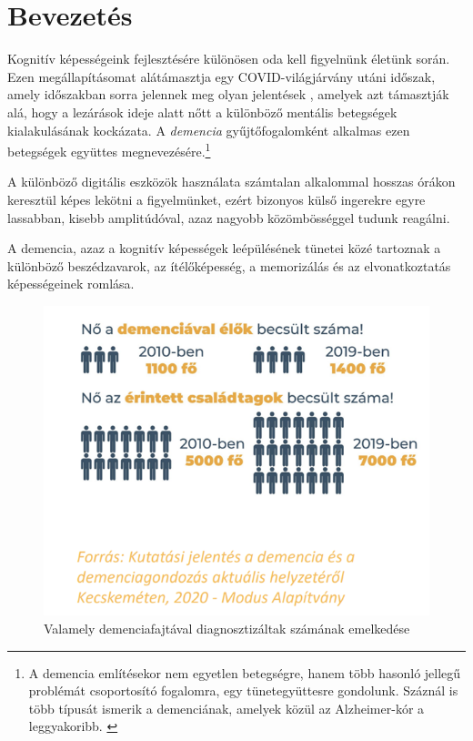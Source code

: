 \documentclass[tocnopagenum]{thesis-ekf}
\theoremstyle{definition}
\theoremstyle{remark}
\begin{document}
	\chapter*{Bevezetés}
	Kognitív képességeink fejlesztésére különösen oda kell figyelnünk életünk során. Ezen megállapításomat alátámasztja egy COVID-világjárvány utáni időszak, amely időszakban sorra jelennek meg olyan jelentések 
	\cite{brain1}, amelyek azt támasztják alá, hogy a lezárások ideje alatt nőtt a különböző mentális betegségek kialakulásának kockázata. A \textit{demencia} gyűjtőfogalomként alkalmas ezen betegségek együttes megnevezésére.\footnote{A demencia említésekor nem egyetlen betegségre, hanem több hasonló jellegű problémát  csoportosító fogalomra, egy tünetegyüttesre gondolunk. Száznál is több típusát ismerik a demenciának, amelyek közül az Alzheimer-kór a leggyakoribb. \cite{demencia_egeszsegvonal}}
	
	A különböző digitális eszközök használata számtalan alkalommal hosszas órákon keresztül képes lekötni a figyelmünket, ezért bizonyos külső ingerekre egyre lassabban, kisebb amplitúdóval, azaz nagyobb közömbösséggel tudunk reagálni. 
	
	A demencia, azaz a kognitív képességek leépülésének tünetei közé tartoznak a különböző beszédzavarok, az ítélőképesség, a memorizálás és az elvonatkoztatás képességeinek romlása.
	
	\begin{figure}[h!]
		\centering
		\includegraphics[scale=0.7]{images/demencia.png}
		\caption{Valamely demenciafajtával diagnosztizáltak számának emelkedése}
		\label{fig:demencia}
	\end{figure}
	
\end{document}
